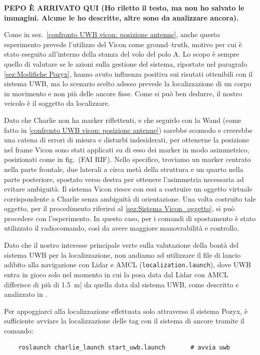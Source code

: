 \textbf{PEPO \`E ARRIVATO QUI (Ho riletto il testo, ma non ho salvato le immagini. Alcune le ho descritte, altre sono da analizzare ancora).}

Come in sez.~\ref{confronto UWB vicon: posizione antenne}, anche questo esperimento prevede l'utilizzo del Vicon come ground--truth, motivo per cui è stato eseguito all'interno della stanza del volo del polo A. Lo scopo è sempre quello di valutare se le azioni sulla gestione del sistema, riportate nel paragrafo \ref{sez:Modifiche Pozyx}, hanno avuto influenza positiva sui risutati ottenibili con il sistema UWB, ma lo scenario scelto adesso prevede la localizzazione di un corpo in movimento e non più delle ancore fisse. Come si può ben dedurre, il nostro veicolo è il soggetto da localizzare.

Dato che Charlie non ha marker riflettenti, e che seguirlo con la Wand (come fatto in \ref{confronto UWB vicon: posizione antenne}) sarebbe scomodo e creerebbe una catena di errori di misura e disturbi indesiderati, per ottenerne la posizione nel frame Vicon sono stati applicati su di esso dei marker in modo asimmetrico, posizionati come in fig.~(FAI RIF). Nello specifico, troviamo un marker centrato nella parte frontale, due laterali a circa metà della struttura e un quarto nella parte posteriore, spostato verso destra per ottenere 
l'asimmetria necessaria ad evitare ambiguità. Il sistema Vicon riesce con essi a costruire un oggetto virtuale corrispondente a Charlie senza ambiguità di orientazione. 
Una volta costruito tale oggetto, per il procedimento riferirsi al \ref{sez:Sistema Vicon_oggetto}, si può procedere con l'esperimento. In questo caso, 
per i comandi di spostamento è stato utilizzato il radiocomando, così da avere maggiore manovrabilità e controllo.

Dato che il nostro interesse principale verte sulla valutazione della bontà del sistema UWB per la localizzazione, non andiamo ad utilizzare il file
di lancio adibito alla navigazione con Lidar e AMCL (\verb|localization.launch|), dove UWB entra in gioco solo nel momento in cui la posa data dal Lidar con AMCL differisce di più di \SI{1.5}{\metre}| da quella data dal sistema UWB, come descritto e analizzato in \cite{ptvlocalizzazione}. 
 
Per appoggiarci alla localizzazione effettuata solo attraverso il sistema Pozyx, è sufficiente avviare la localizzazione delle tag con il sistema di ancore tramite il comando:
\begin{verbatim}
	roslaunch charlie_launch start_uwb.launch		# avvia uwb
\end{verbatim} 


